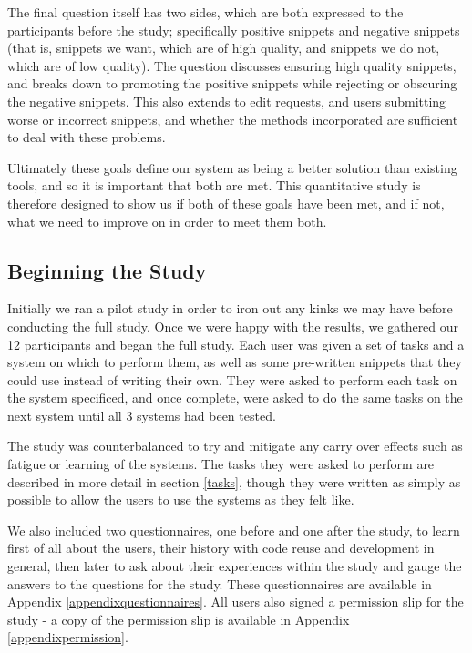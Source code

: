 The final question itself has two sides, which are both expressed to the participants before the study; specifically positive snippets and negative snippets (that is, snippets we want, which are of high quality, and snippets we do not, which are of low quality). 
The question discusses ensuring high quality snippets, and breaks down to promoting the positive snippets while rejecting or obscuring the negative snippets.
This also extends to edit requests, and users submitting worse or incorrect snippets, and whether the methods incorporated are sufficient to deal with these problems.

Ultimately these goals define our system as being a better solution than existing tools, and so it is important that both are met.
This quantitative study is therefore designed to show us if both of these goals have been met, and if not, what we need to improve on in order to meet them both.

\subsection{Beginning the Study}
Initially we ran a pilot study in order to iron out any kinks we may have before conducting the full study.
Once we were happy with the results, we gathered our 12 participants and began the full study.
Each user was given a set of tasks and a system on which to perform them, as well as some pre-written snippets that they could use instead of writing their own.
They were asked to perform each task on the system specificed, and once complete, were asked to do the same tasks on the next system until all 3 systems had been tested.

The study was counterbalanced to try and mitigate any carry over effects such as fatigue or learning of the systems. 
The tasks they were asked to perform are described in more detail in section \ref{tasks}, though they were written as simply as possible to allow the users to use the systems as they felt like.

We also included two questionnaires, one before and one after the study, to learn first of all about the users, their history with code reuse and development in general, then later to ask about their experiences within the study and gauge the answers to the questions for the study.
These questionnaires are available in Appendix \ref{appendixquestionnaires}.
All users also signed a permission slip for the study - a copy of the permission slip is available in Appendix \ref{appendixpermission}.

